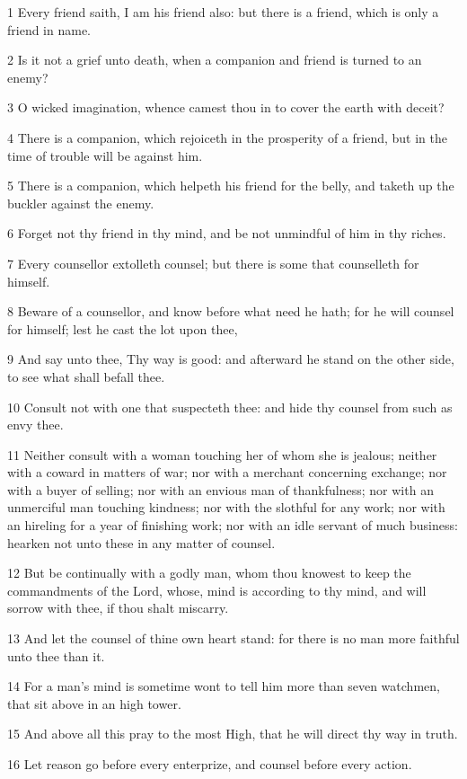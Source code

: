 \par 1 Every friend saith, I am his friend also: but there is a friend, which is only a friend in name.
\par 2 Is it not a grief unto death, when a companion and friend is turned to an enemy?
\par 3 O wicked imagination, whence camest thou in to cover the earth with deceit?
\par 4 There is a companion, which rejoiceth in the prosperity of a friend, but in the time of trouble will be against him.
\par 5 There is a companion, which helpeth his friend for the belly, and taketh up the buckler against the enemy.
\par 6 Forget not thy friend in thy mind, and be not unmindful of him in thy riches.
\par 7 Every counsellor extolleth counsel; but there is some that counselleth for himself.
\par 8 Beware of a counsellor, and know before what need he hath; for he will counsel for himself; lest he cast the lot upon thee,
\par 9 And say unto thee, Thy way is good: and afterward he stand on the other side, to see what shall befall thee.
\par 10 Consult not with one that suspecteth thee: and hide thy counsel from such as envy thee.
\par 11 Neither consult with a woman touching her of whom she is jealous; neither with a coward in matters of war; nor with a merchant concerning exchange; nor with a buyer of selling; nor with an envious man of thankfulness; nor with an unmerciful man touching kindness; nor with the slothful for any work; nor with an hireling for a year of finishing work; nor with an idle servant of much business: hearken not unto these in any matter of counsel.
\par 12 But be continually with a godly man, whom thou knowest to keep the commandments of the Lord, whose, mind is according to thy mind, and will sorrow with thee, if thou shalt miscarry.
\par 13 And let the counsel of thine own heart stand: for there is no man more faithful unto thee than it.
\par 14 For a man's mind is sometime wont to tell him more than seven watchmen, that sit above in an high tower.
\par 15 And above all this pray to the most High, that he will direct thy way in truth.
\par 16 Let reason go before every enterprize, and counsel before every action.
